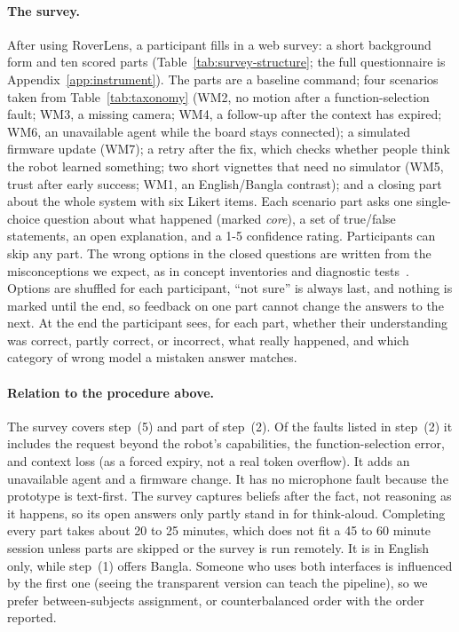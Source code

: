 \documentclass[sigconf]{acmart}
\begin{document}
\paragraph{The survey.}
After using RoverLens, a participant fills in a web survey: a short background form and ten scored parts (Table~\ref{tab:survey-structure}; the full questionnaire is Appendix~\ref{app:instrument}). The parts are a baseline command; four scenarios taken from Table~\ref{tab:taxonomy} (WM2, no motion after a function-selection fault; WM3, a missing camera; WM4, a follow-up after the context has expired; WM6, an unavailable agent while the board stays connected); a simulated firmware update (WM7); a retry after the fix, which checks whether people think the robot learned something; two short vignettes that need no simulator (WM5, trust after early success; WM1, an English/Bangla contrast); and a closing part about the whole system with six Likert items. Each scenario part asks one single-choice question about what happened (marked \emph{core}), a set of true/false statements, an open explanation, and a 1-5 confidence rating. Participants can skip any part. The wrong options in the closed questions are written from the misconceptions we expect, as in concept inventories and diagnostic tests~\cite{hestenes1992force, treagust1988development}. Options are shuffled for each participant, ``not sure'' is always last, and nothing is marked until the end, so feedback on one part cannot change the answers to the next. At the end the participant sees, for each part, whether their understanding was correct, partly correct, or incorrect, what really happened, and which category of wrong model a mistaken answer matches.



\paragraph{Relation to the procedure above.}
The survey covers step~(5) and part of step~(2). Of the faults listed in step~(2) it includes the request beyond the robot's capabilities, the function-selection error, and context loss (as a forced expiry, not a real token overflow). It adds an unavailable agent and a firmware change. It has no microphone fault because the prototype is text-first. The survey captures beliefs after the fact, not reasoning as it happens, so its open answers only partly stand in for think-aloud. Completing every part takes about 20 to 25 minutes, which does not fit a 45 to 60 minute session unless parts are skipped or the survey is run remotely. It is in English only, while step~(1) offers Bangla. Someone who uses both interfaces is influenced by the first one (seeing the transparent version can teach the pipeline), so we prefer between-subjects assignment, or counterbalanced order with the order reported.
\end{document}
